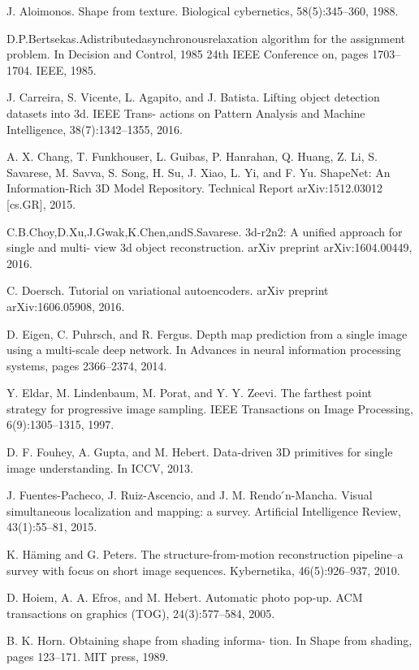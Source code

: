 \begin{translationbib}
	\item J. Aloimonos. Shape from texture. Biological cybernetics, 58(5):345–360, 1988.
	\item D.P.Bertsekas.Adistributedasynchronousrelaxation algorithm for the assignment problem. In Decision and Control, 1985 24th IEEE Conference on, pages 1703–1704. IEEE, 1985.
	\item J. Carreira, S. Vicente, L. Agapito, and J. Batista. Lifting object detection datasets into 3d. IEEE Trans- actions on Pattern Analysis and Machine Intelligence, 38(7):1342–1355, 2016.
	\item A. X. Chang, T. Funkhouser, L. Guibas, P. Hanrahan, Q. Huang, Z. Li, S. Savarese, M. Savva, S. Song, H. Su, J. Xiao, L. Yi, and F. Yu. ShapeNet: An Information-Rich 3D Model Repository. Technical Report arXiv:1512.03012 [cs.GR], 2015.
	\item C.B.Choy,D.Xu,J.Gwak,K.Chen,andS.Savarese. 3d-r2n2: A unified approach for single and multi- view 3d object reconstruction. arXiv preprint arXiv:1604.00449, 2016.
	\item C. Doersch. Tutorial on variational autoencoders. arXiv preprint arXiv:1606.05908, 2016.
	\item D. Eigen, C. Puhrsch, and R. Fergus. Depth map prediction from a single image using a multi-scale deep network. In Advances in neural information processing systems, pages 2366–2374, 2014.
	\item Y. Eldar, M. Lindenbaum, M. Porat, and Y. Y. Zeevi. The farthest point strategy for progressive image sampling. IEEE Transactions on Image Processing, 6(9):1305–1315, 1997.
	\item D. F. Fouhey, A. Gupta, and M. Hebert. Data-driven 3D primitives for single image understanding. In ICCV, 2013.
	\item J. Fuentes-Pacheco, J. Ruiz-Ascencio, and J. M. Rendo ́n-Mancha. Visual simultaneous localization and mapping: a survey. Artificial Intelligence Review, 43(1):55–81, 2015.
	\item K. H{\"a}ming and G. Peters. The structure-from-motion reconstruction pipeline–a survey with focus on short image sequences. Kybernetika, 46(5):926–937, 2010.
	\item D. Hoiem, A. A. Efros, and M. Hebert. Automatic photo pop-up. ACM transactions on graphics (TOG), 24(3):577–584, 2005.
	\item B. K. Horn. Obtaining shape from shading informa- tion. In Shape from shading, pages 123–171. MIT press, 1989.

\end{translationbib}
